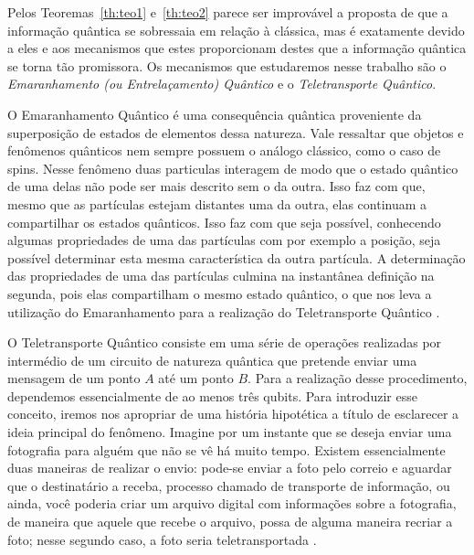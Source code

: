 \documentclass[12pt,oneside,brazil,hidelinks,article,sumario=tradicional,a4paper]{abntex2}
\begin{document}
Pelos Teoremas~\ref{th:teo1} e~\ref{th:teo2} parece ser improvável a proposta de que a informação quântica se sobressaia em relação à clássica, mas é exatamente devido a eles e aos mecanismos que estes proporcionam destes que a informação quântica se torna tão promissora. Os mecanismos que estudaremos nesse trabalho são o \textit{Emaranhamento (ou Entrelaçamento) Quântico} e o \textit{Teletransporte Quântico}.

O Emaranhamento Quântico é uma consequência quântica proveniente da superposição de estados de elementos dessa natureza. Vale ressaltar que objetos e fenômenos quânticos nem sempre possuem o análogo clássico, como o caso de spins. Nesse fenômeno duas particulas interagem de modo que o estado quântico de uma delas não pode ser mais descrito sem o da outra. Isso faz com que, mesmo que as partículas estejam distantes uma da outra, elas continuam a compartilhar os estados quânticos. Isso faz com que seja possível, conhecendo algumas propriedades de uma das partículas com por exemplo a posição, seja possível determinar esta mesma característica da outra partícula. A determinação das propriedades de uma das partículas culmina na instantânea definição na segunda, pois elas compartilham o mesmo estado quântico, o que nos leva a utilização do Emaranhamento para a realização do Teletransporte Quântico \cites{materialdidaticomecquantica}{fonzar}{TeoQuanInfoEntreCopia}.

O Teletransporte Quântico consiste em uma série de operações realizadas por intermédio de um circuito de natureza quântica que pretende enviar uma mensagem de um ponto \(A\) até um ponto \(B\). Para a realização desse procedimento, dependemos essencialmente de ao menos três qubits. Para introduzir esse conceito, iremos nos apropriar de uma história hipotética a título de esclarecer a ideia principal do fenômeno. Imagine por um instante que se deseja enviar uma fotografia para alguém que não se vê há muito tempo. Existem essencialmente duas maneiras de realizar o envio: pode-se enviar a foto pelo correio e aguardar que o destinatário a receba, processo chamado de transporte de informação, ou ainda, você poderia criar um arquivo digital com informações sobre a fotografia, de maneira que aquele que recebe o arquivo, possa de alguma maneira recriar a foto; nesse segundo caso, a foto seria teletransportada \cite{materialdidaticomecquantica}.
\end{document}
